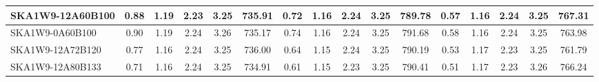 \begin{table}[H]
{{\begin{tabular}{|lccccc||ccccc||ccccc|}
SKA1W9-12A60B100 & 0.88 \cellcolor{blue!46.78} & 1.19 \cellcolor{red!36.63} & 2.23 \cellcolor{green!28.20} & 3.25 \cellcolor{orange!38.62} & 735.91 \cellcolor{purple!29.65} & 0.72 \cellcolor{blue!45.46} & 1.16 \cellcolor{red!23.49} & 2.24 \cellcolor{green!32.73} & 3.25 \cellcolor{orange!54.68} & 789.78 \cellcolor{purple!18.00} & 0.57 \cellcolor{blue!47.57} & 1.16 \cellcolor{red!24.36} & 2.24 \cellcolor{green!43.37} & 3.25 \cellcolor{orange!32.00} & 767.31 \cellcolor{purple!60.00}\\ \hline 
SKA1W9-0A60B100 & 0.90 \cellcolor{blue!49.50} & 1.19 \cellcolor{red!38.48} & 2.24 \cellcolor{green!39.09} & 3.26 \cellcolor{orange!43.15} & 735.17 \cellcolor{purple!27.24} & 0.74 \cellcolor{blue!49.02} & 1.16 \cellcolor{red!24.43} & 2.24 \cellcolor{green!41.51} & 3.25 \cellcolor{orange!60.00} & 791.68 \cellcolor{purple!56.61} & 0.58 \cellcolor{blue!53.60} & 1.16 \cellcolor{red!28.42} & 2.24 \cellcolor{green!60.00} & 3.25 \cellcolor{orange!25.32} & 763.98 \cellcolor{purple!35.90}\\ \hline 
SKA1W9-12A72B120 & 0.77 \cellcolor{blue!28.28} & 1.16 \cellcolor{red!21.39} & 2.24 \cellcolor{green!42.02} & 3.25 \cellcolor{orange!39.38} & 736.00 \cellcolor{purple!29.93} & 0.64 \cellcolor{blue!25.58} & 1.15 \cellcolor{red!18.00} & 2.24 \cellcolor{green!34.61} & 3.25 \cellcolor{orange!27.57} & 790.19 \cellcolor{purple!26.29} & 0.53 \cellcolor{blue!29.37} & 1.17 \cellcolor{red!36.24} & 2.23 \cellcolor{green!18.00} & 3.25 \cellcolor{orange!18.00} & 761.79 \cellcolor{purple!20.11}\\ \hline 
SKA1W9-12A80B133 & 0.71 \cellcolor{blue!18.00} & 1.16 \cellcolor{red!18.00} & 2.24 \cellcolor{green!45.31} & 3.25 \cellcolor{orange!18.00} & 734.91 \cellcolor{purple!26.39} & 0.61 \cellcolor{blue!18.00} & 1.15 \cellcolor{red!20.31} & 2.23 \cellcolor{green!30.54} & 3.25 \cellcolor{orange!18.00} & 790.41 \cellcolor{purple!30.68} & 0.51 \cellcolor{blue!18.00} & 1.17 \cellcolor{red!39.68} & 2.23 \cellcolor{green!20.50} & 3.26 \cellcolor{orange!60.00} & 766.24 \cellcolor{purple!52.27}\\ \hline 
\end{tabular}}
\vspace{-0.300000cm}
\hspace{1cm} 
}
\end{table}
